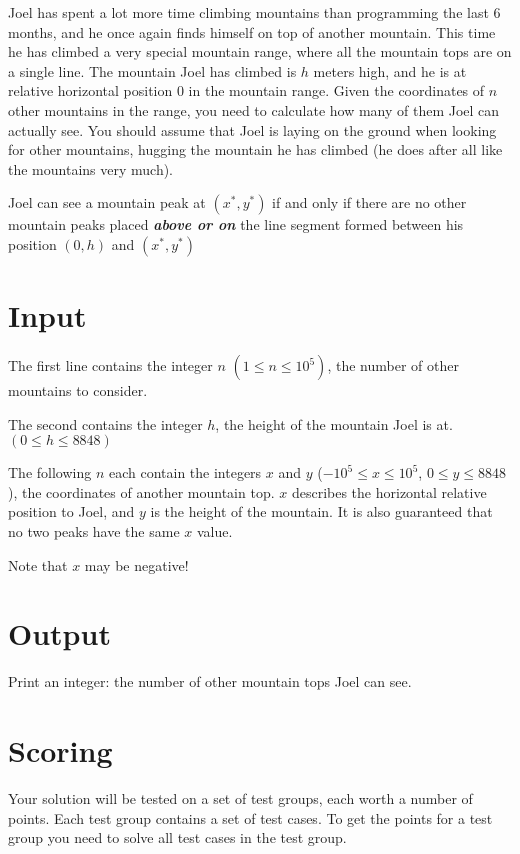 \noindent


Joel has spent a lot more time climbing mountains than programming the last 6 months, and he once again finds himself on top of another mountain.
This time he has climbed a very special mountain range, where all the mountain tops are on a single line. 
The mountain Joel has climbed is $h$ meters high, and he is at relative horizontal position $0$ in the mountain range.
Given the coordinates of $n$ other mountains in the range, you need to calculate how many of them Joel can actually see.
You should assume that Joel is laying on the ground when looking for other mountains, hugging the mountain he has climbed (he does after all like the mountains very much).

Joel can see a mountain peak at $(x^*, y^*)$ if and only if there are no other mountain peaks placed \textbf{\emph{above or on}} the line segment formed between his position $(0, h)$ and $(x^*, y^*)$

\section*{Input}
The first line contains the integer $n$ $(1 \leq n \leq 10^{5})$, the number of other mountains to consider. 

The second contains the integer $h$, the height of the mountain Joel is at. $(0 \leq h \leq 8848)$

The following $n$ each contain the integers $x$ and $y$ ($-10^{5} \leq x \leq 10^{5}$, $0 \leq y \leq 8848$), the coordinates of another mountain top.
$x$ describes the horizontal relative position to Joel, and $y$ is the height of the mountain. It is also guaranteed that no two peaks have the same $x$ value.

Note that $x$ may be negative!

\section*{Output}
Print an integer: the number of other mountain tops Joel can see. 


\section*{Scoring}
Your solution will be tested on a set of test groups, each worth a number of points. Each test group contains
a set of test cases. To get the points for a test group you need to solve all test cases in the test group.

